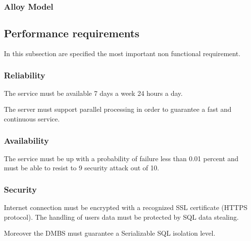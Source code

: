 \subsubsection{Alloy Model}
\begin{itemize}
	\newpage
	\newpage
	\newpage
	\newpage
	\newpage
	\newpage
\end{itemize}
\subsection{Performance requirements}
In this subsection are specified the most important non functional requirement.
\subsubsection{Reliability}
The service must be available 7 days a week 24 hours a day. \par The server must support parallel processing in order to guarantee a fast and continuous service.
\subsubsection{Availability}
The service must be up with a probability of failure less than 0.01 percent and must be able to resist to 9 security attack out of 10.
\subsubsection{Security}
Internet connection must be encrypted with a recognized SSL certificate (HTTPS protocol). The handling of users data must be protected by SQL data stealing. \par Moreover the DMBS must guarantee a Serializable SQL isolation level.
